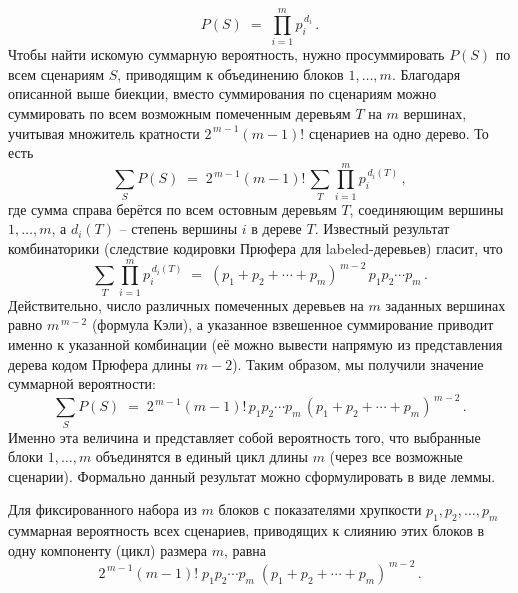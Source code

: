 \[
P(S) \;=\; \prod_{i=1}^{m} p_i^{\,d_i}\,. 
\] 
Чтобы найти искомую суммарную вероятность, нужно просуммировать $P(S)$ по всем сценариям $S$, приводящим к объединению блоков $1,\dots,m$. Благодаря описанной выше биекции, вместо суммирования по сценариям можно суммировать по всем возможным помеченным деревьям $T$ на $m$ вершинах, учитывая множитель кратности $2^{\,m-1}(m-1)!$ сценариев на одно дерево. То есть 
\[
\sum_{S} P(S) \;=\; 2^{\,m-1}(m-1)!\, \sum_{T} \prod_{i=1}^m p_i^{\,d_i(T)}\,,
\] 
где сумма справа берётся по всем остовным деревьям $T$, соединяющим вершины $1,\dots,m$, а $d_i(T)$ -- степень вершины $i$ в дереве $T$. Известный результат комбинаторики (следствие кодировки Прюфера для labeled-деревьев) гласит, что 
\[
\sum_{T} \prod_{i=1}^m p_i^{\,d_i(T)} \;=\; (p_1 + p_2 + \cdots + p_m)^{\,m-2}\, p_1 p_2 \cdots p_m\,.
\] 
Действительно, число различных помеченных деревьев на $m$ заданных вершинах равно $m^{\,m-2}$ (формула Кэли), а указанное взвешенное суммирование приводит именно к указанной комбинации (её можно вывести напрямую из представления дерева кодом Прюфера длины $m-2$). Таким образом, мы получили значение суммарной вероятности:
\[
\sum_{S} P(S) \;=\; 2^{\,m-1}(m-1)!\, p_1 p_2 \cdots p_m\, (p_1 + p_2 + \cdots + p_m)^{\,m-2}\,. 
\]
Именно эта величина и представляет собой вероятность того, что выбранные блоки $1,\dots,m$ объединятся в единый цикл длины $m$ (через все возможные сценарии). Формально данный результат можно сформулировать в виде леммы.

\begin{lemma}\label{lem:prufer}
Для фиксированного набора из $m$ блоков с показателями хрупкости $p_1, p_2, \dots, p_m$ суммарная вероятность всех сценариев, приводящих к слиянию этих блоков в одну компоненту (цикл) размера $m$, равна
\[
2^{\,m-1}(m-1)!\; p_1 p_2 \cdots p_m \; (p_1 + p_2 + \cdots + p_m)^{\,m-2}\,.
\] 
\end{lemma}

